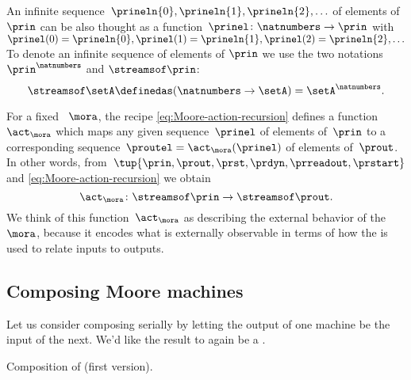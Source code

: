 An infinite sequence~$\prineln{0}, \prineln{1}, \prineln{2}, \ldots$ of elements of~$\prin$ can be also thought as a function~$\prinel \colon \natnumbers \to \prin$ with~$\prinel(0) = \prineln{0}, \prinel(1) = \prineln{1}, \prinel(2) = \prineln{2}, \ldots$ \etc
To denote an infinite sequence of elements of $\prin$ we use the two notations $\prin^{\natnumbers}$ and $\streamsof\prin$:
\begin{equation}
    \streamsof \setA \definedas (\natnumbers \to \setA) = \setA^{\natnumbers}.
\end{equation}

For a fixed ~$\mora$, the recipe \cref{eq:Moore-action-recursion} defines a function~$\act_\mora$ which maps any given sequence~$\prinel$ of elements of~$\prin$ to a corresponding sequence~$\proutel = \act_\mora(\prinel)$ of elements of~$\prout$.
In other words, from~$\tup{\prin, \prout, \prst, \prdyn, \prreadout, \prstart}$ and \cref{eq:Moore-action-recursion} we obtain
\begin{equation}
    \act_\mora \colon \streamsof\prin  \to \streamsof\prout.
\end{equation}
We think of this function~$\act_\mora$ as describing the external behavior of the ~$\mora$, because it encodes what is externally observable in terms of how the  is used to relate inputs to outputs.


\subsection{Composing Moore machines}

Let us consider composing  serially by letting the output of one machine be the input of the next.
We'd like the result to again be a .

\begin{marginfigure}
    \centering
    \caption{Composition of  (first version).}
    \label{fig:comp_moore_1}
\end{marginfigure}

